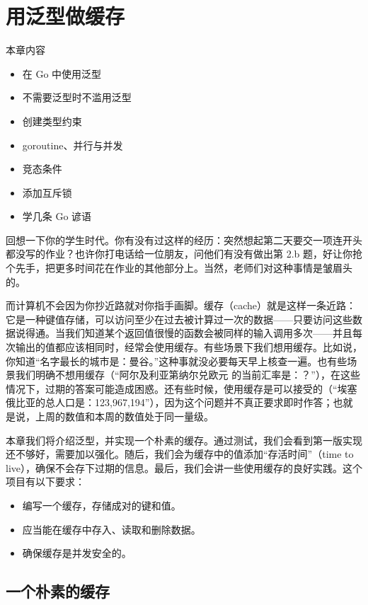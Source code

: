 \chapter{用泛型做缓存}

\begin{infobox}{本章内容}
\begin{itemize}
  \item 在 Go 中使用泛型
  \item 不需要泛型时不滥用泛型
  \item 创建类型约束
  \item goroutine、并行与并发
  \item 竞态条件
  \item 添加互斥锁
  \item 学几条 Go 谚语
\end{itemize}
\end{infobox}

回想一下你的学生时代。你有没有过这样的经历：突然想起第二天要交一项连开头都没写的作业？也许你打电话给一位朋友，问他们有没有做出第 2.b 题，好让你抢个先手，把更多时间花在作业的其他部分上。当然，老师们对这种事情是皱眉头的。

而计算机不会因为你抄近路就对你指手画脚。缓存（cache）就是这样一条近路：它是一种键值存储，可以访问至少在过去被计算过一次的数据——只要访问这些数据说得通。当我们知道某个返回值很慢的函数会被同样的输入调用多次——并且每次输出的值都应该相同时，经常会使用缓存。有些场景下我们想用缓存。比如说，你知道``名字最长的城市是：曼谷。''这种事就没必要每天早上核查一遍。也有些场景我们明确不想用缓存（``阿尔及利亚第纳尔兑欧元
的当前汇率是：？''），在这些情况下，过期的答案可能造成困惑。还有些时候，使用缓存是可以接受的（``埃塞俄比亚的总人口是：123{,}967{,}194''），因为这个问题并不真正要求即时作答；也就是说，上周的数值和本周的数值处于同一量级。

本章我们将介绍泛型，并实现一个朴素的缓存。通过测试，我们会看到第一版实现还不够好，需要加以强化。随后，我们会为缓存中的值添加``存活时间''（time to live），确保不会存下过期的信息。最后，我们会讲一些使用缓存的良好实践。这个项目有以下要求：

\begin{itemize}
  \item 编写一个缓存，存储成对的键和值。
  \item 应当能在缓存中存入、读取和删除数据。
  \item 确保缓存是并发安全的。
\end{itemize}

\section{一个朴素的缓存}


